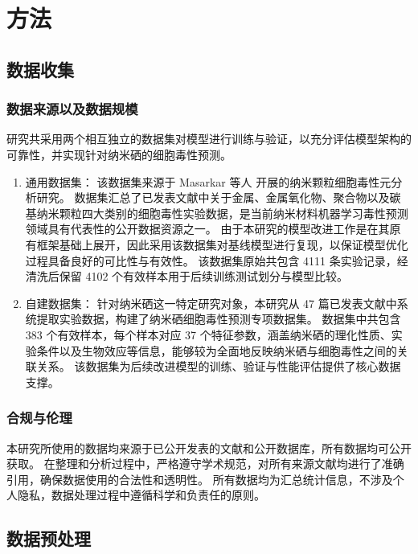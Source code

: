 \section{方法}

\subsection{数据收集}

\subsubsection{数据来源以及数据规模}

研究共采用两个相互独立的数据集对模型进行训练与验证，以充分评估模型架构的可靠性，并实现针对纳米硒的细胞毒性预测。

\begin{enumerate}
  \item 通用数据集：
该数据集来源于 Masarkar 等人 \cite{masarkar2024} 开展的纳米颗粒细胞毒性元分析研究。
数据集汇总了已发表文献中关于金属、金属氧化物、聚合物以及碳基纳米颗粒四大类别的细胞毒性实验数据，是当前纳米材料机器学习毒性预测领域具有代表性的公开数据资源之一。
由于本研究的模型改进工作是在其原有框架基础上展开，因此采用该数据集对基线模型进行复现，以保证模型优化过程具备良好的可比性与有效性。
该数据集原始共包含 4111 条实验记录，经清洗后保留 4102 个有效样本用于后续训练测试划分与模型比较。

  \item 自建数据集：
针对纳米硒这一特定研究对象，本研究从 47 篇已发表文献中系统提取实验数据，构建了纳米硒细胞毒性预测专项数据集。
数据集中共包含 383 个有效样本，每个样本对应 37 个特征参数，涵盖纳米硒的理化性质、实验条件以及生物效应等信息，能够较为全面地反映纳米硒与细胞毒性之间的关联关系。
该数据集为后续改进模型的训练、验证与性能评估提供了核心数据支撑。
\end{enumerate}

\subsubsection{合规与伦理}

本研究所使用的数据均来源于已公开发表的文献和公开数据库，所有数据均可公开获取。
在整理和分析过程中，严格遵守学术规范，对所有来源文献均进行了准确引用，确保数据使用的合法性和透明性。
所有数据均为汇总统计信息，不涉及个人隐私，数据处理过程中遵循科学和负责任的原则。

\subsection{数据预处理}

